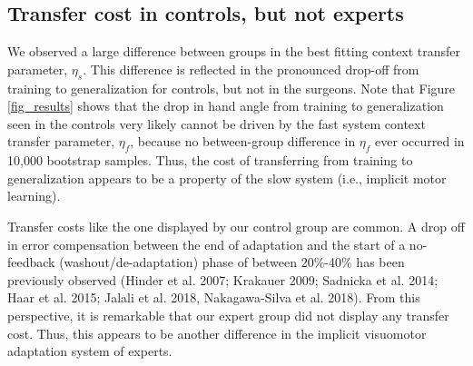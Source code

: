 \documentclass[jou, apacite, 11pt, longtable, floatsintext, notab]{apa6}
\begin{document}
\subsection{Transfer cost in controls, but not experts}
We observed a large difference between groups in the best
fitting context transfer parameter, $\eta_s$. This
difference is reflected in the pronounced drop-off from
training to generalization for controls, but not in the
surgeons. Note that Figure \ref{fig_results} shows that the
drop in hand angle from training to generalization seen in
the controls very likely cannot be driven by the fast system
context transfer parameter, $\eta_f$, because no
between-group difference in $\eta_f$ ever occurred in 10,000
bootstrap samples. Thus, the cost of transferring from
training to generalization appears to be a property of the
slow system (i.e., implicit motor learning).

Transfer costs like the one displayed by our control group
are common. A drop off in error compensation between the end
of adaptation and the start of a no-feedback
(washout/de-adaptation) phase of between 20\%-40\% has been
previously observed (Hinder et al. 2007; Krakauer 2009;
Sadnicka et al. 2014; Haar et al. 2015; Jalali et al. 2018,
Nakagawa-Silva et al. 2018). From this perspective, it is
remarkable that our expert group did not display any
transfer cost. Thus, this appears to be another difference
in the implicit visuomotor adaptation system of experts.

\end{document}
